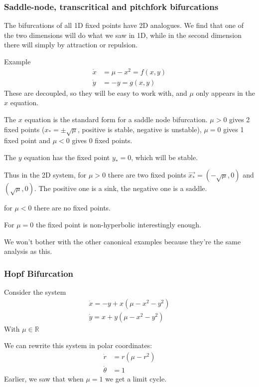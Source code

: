 \documentclass{X:/Documents/Coding/Latex/myassignment}
\begin{document}
\subsubsection{Saddle-node, transcritical and pitchfork bifurcations}
The bifurcations of all 1D fixed points have 2D analogues. We find that one of the two dimensions will do what we saw in 1D, while in the second dimension there will simply by attraction or repulsion.

Example
\begin{align*}
    \dot x &= \mu - x^2 = f(x,y)\\
    \dot y &= - y = g(x,y)
\end{align*}
These are decoupled, so they will be easy to work with, and $\mu$ only appears in the $x$ equation.

The $x$ equation is the standard form for a saddle node bifurcation. $\mu > 0$ gives 2 fixed points ($x_*=\pm\sqrt{\mu}$, positive is stable, negative is unstable), $\mu = 0$ gives 1 fixed point and $\mu <0$ gives 0 fixed points.

The $y$ equation has the fixed point $y_*=0$, which will be stable.

Thus in the 2D system, for $\mu>0$ there are two fixed points $\vec{x_*} = \left(-\sqrt{\mu},0\right)$ and $\left(\sqrt{\mu},0\right)$. The positive one is a sink, the negative one is a saddle.

for $\mu <0$ there are no fixed points.

For $\mu=0$ the fixed point is non-hyperbolic interestingly enough.


We won't bother with the other canonical examples because they're the same analysis as this.


\subsubsection{Hopf Bifurcation}
Consider the system
\begin{align*}
    \dot x = -y + x(\mu - x^2 - y^2)\\
    \dot y = x + y(\mu-x^2-y^2)
\end{align*}
With $\mu \in \mathbb{R}$

We can rewrite this system in polar coordinates:
\begin{align*}
    \dot r &= r(\mu - r^2)\\
    \dot\theta &= 1
\end{align*}
Earlier, we saw that when $\mu=1$ we get a limit cycle. 
\end{document}

